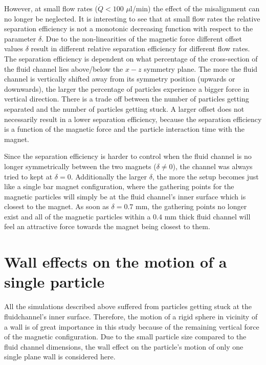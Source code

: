 However, at small flow rates ($\dot{Q} < 100$ $\mu$l/min) the effect of the misalignment can no longer be neglected. It is interesting to see that at small flow rates the relative separation efficiency is not a monotonic decreasing function with respect to the parameter $\delta$. Due to the non-linearities of the magnetic force different offset values $\delta$ result in different relative separation efficiency for different flow rates. The separation efficiency is dependent on what percentage of the cross-section of the fluid channel lies above/below the $x-z$ symmetry plane. The more the fluid channel is vertically shifted away from its symmetry position (upwards or downwards), the larger the percentage of particles experience a bigger force in vertical direction. There is a trade off between the number of particles getting separated and the number of particles getting stuck. A larger offset does not necessarily result in a lower separation efficiency, because the separation efficiency is a function of the magnetic force and the particle interaction time with the magnet.

Since the separation efficiency is harder to control when the fluid channel is no longer symmetrically between the two magnets ($\delta \neq 0$), the channel was always tried to kept at $\delta=0$. Additionally the larger $\delta$, the more the setup becomes just like a single bar magnet configuration, where the gathering points for the magnetic particles will simply be at the fluid channel's inner surface which is closest to the magnet. As soon as $\delta=0.7$ mm, the gathering points no longer exist and all of the magnetic particles within a $0.4$ mm thick fluid channel will feel an attractive force towards the magnet being closest to them.

\section{Wall effects on the motion of a single particle}
\label{sec:wallEffectsOnTheMotionOfASingleParticle}
All the simulations described above suffered from particles getting stuck at the fluidchannel's inner surface. Therefore, the motion of a rigid sphere in vicinity of a wall is of great importance in this study because of the remaining vertical force of the magnetic configuration. Due to the small particle size compared to the fluid channel dimensions, the wall effect on the particle's motion of only one single plane wall is considered here. 

